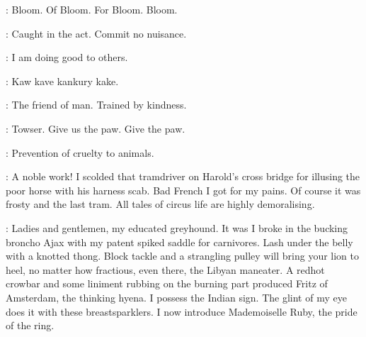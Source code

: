 
\Watch:
Bloom.
Of Bloom.
For Bloom.
Bloom.


\FirstWatch:
Caught in the act.
Commit no nuisance.

\Bloom:
I am doing good to others.


\Gulls:
Kaw kave kankury kake.

\Bloom:
The friend of man.
Trained by kindness.


\Doran:
Towser.
Give us the paw.
Give the paw.


\SecondWatch:
Prevention of cruelty to animals.

\Bloom:
A noble work!
I scolded that tramdriver on Harold's cross bridge
for illusing the poor horse with his harness scab.
Bad French I got for my pains.
Of course it was frosty and the last tram.
All tales of circus life are highly demoralising.


\Maffei:
Ladies and gentlemen, my educated greyhound.
It was I broke in the bucking broncho Ajax
with my patent spiked saddle for carnivores.
Lash under the belly with a knotted thong.
Block tackle and a strangling pulley will bring your lion to heel,
no matter how fractious, even  there, the Libyan maneater.
A redhot crowbar and some liniment rubbing on the burning part
produced Fritz of Amsterdam, the thinking hyena.
I possess the Indian sign.
The glint of my eye does it with these breastsparklers.
I now introduce Mademoiselle Ruby, the pride of the ring.

